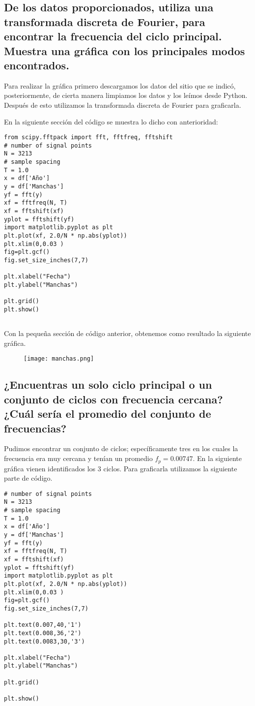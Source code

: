 \subsection*{De los datos proporcionados, utiliza una transformada discreta de Fourier, para encontrar la frecuencia del ciclo principal. Muestra una gráfica con los principales modos encontrados. 
}

\noindent Para realizar la gráfica primero descargamos los datos del sitio que se indicó, posteriormente, de cierta manera limpiamos los datos y los leímos desde Python. Después de esto utilizamos la transformada discreta de Fourier para graficarla. 

En la siguiente sección del código se muestra lo dicho con anterioridad:

\begin{verbatim}
from scipy.fftpack import fft, fftfreq, fftshift
# number of signal points
N = 3213
# sample spacing
T = 1.0
x = df['Año']
y = df['Manchas']
yf = fft(y)
xf = fftfreq(N, T)
xf = fftshift(xf)
yplot = fftshift(yf)
import matplotlib.pyplot as plt
plt.plot(xf, 2.0/N * np.abs(yplot))
plt.xlim(0,0.03 )
fig=plt.gcf()
fig.set_size_inches(7,7)

plt.xlabel("Fecha")
plt.ylabel("Manchas")

plt.grid()
plt.show()


\end{verbatim}
Con la pequeña sección de código anterior, obtenemos como resultado la siguiente gráfica.

\begin{figure}[ht!]
\centering
\texttt{[image: manchas.png]}
\end{figure}
\newpage
\subsection*{¿Encuentras un solo ciclo principal o un conjunto de ciclos con frecuencia cercana? ¿Cuál sería el promedio del conjunto de frecuencias?}
\noindent Pudimos encontrar un conjunto de ciclos; específicamente tres en los cuales la frecuencia era muy cercana y tenían un promedio $f_p=0.00747$. En la siguiente gráfica vienen identificados los 3 ciclos. Para graficarla utilizamos la siguiente parte de código. 

\begin{verbatim}
# number of signal points
N = 3213
# sample spacing
T = 1.0
x = df['Año']
y = df['Manchas']
yf = fft(y)
xf = fftfreq(N, T)
xf = fftshift(xf)
yplot = fftshift(yf)
import matplotlib.pyplot as plt
plt.plot(xf, 2.0/N * np.abs(yplot))
plt.xlim(0,0.03 )
fig=plt.gcf()
fig.set_size_inches(7,7)

plt.text(0.007,40,'1')
plt.text(0.008,36,'2')
plt.text(0.0083,30,'3')

plt.xlabel("Fecha")
plt.ylabel("Manchas")

plt.grid()

plt.show()
\end{verbatim}


